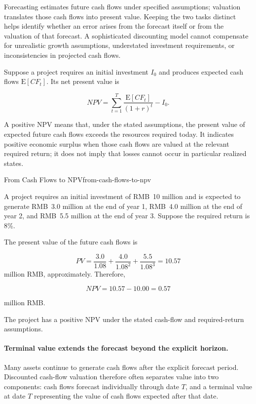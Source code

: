 Forecasting estimates future cash flows under specified assumptions; valuation translates those cash flows into present value. Keeping the two tasks distinct helps identify whether an error arises from the forecast itself or from the valuation of that forecast. A sophisticated discounting model cannot compensate for unrealistic growth assumptions, understated investment requirements, or inconsistencies in projected cash flows.

Suppose a project requires an initial investment $I_0$ and produces expected cash flows $\mathrm{E}[CF_t]$. Its net present value is

\begin{equation}
NPV=\sum_{t=1}^{T}
\frac{\mathrm{E}[CF_t]}{(1+r)^t}-I_0.
\label{eq:ch5-npv}
\end{equation}

A positive NPV means that, under the stated assumptions, the present value of expected future cash flows exceeds the resources required today. It indicates positive economic surplus when those cash flows are valued at the relevant required return; it does not imply that losses cannot occur in particular realized states.

\begin{example}{From Cash Flows to NPV}{from-cash-flows-to-npv}


A project requires an initial investment of RMB~10 million and is expected to generate RMB~3.0 million at the end of year 1, RMB~4.0 million at the end of year 2, and RMB~5.5 million at the end of year 3. Suppose the required return is 8\%.

The present value of the future cash flows is

$$
PV=\frac{3.0}{1.08}+\frac{4.0}{1.08^2}+\frac{5.5}{1.08^3}=10.57
$$
million RMB, approximately. Therefore,

$$
NPV=10.57-10.00=0.57
$$

million RMB.

The project has a positive NPV under the stated cash-flow and required-return assumptions.

\end{example}

\paragraph{Terminal value extends the forecast beyond the explicit horizon.}

Many assets continue to generate cash flows after the explicit forecast period. Discounted cash-flow valuation therefore often separates value into two components: cash flows forecast individually through date $T$, and a terminal value at date $T$ representing the value of cash flows expected after that date.

